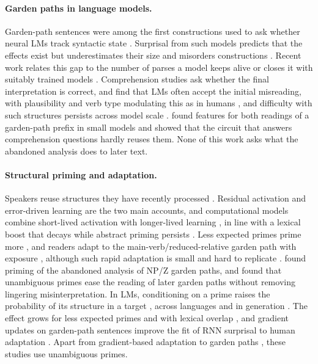 \documentclass[11pt]{article}
\begin{document}
\paragraph{Garden paths in language models.}
Garden-path sentences were among the first constructions used to ask whether neural LMs track syntactic state \citep{futrell2019}.
Surprisal from such models predicts that the effects exist but underestimates their size and misorders constructions \citep{vanschijndel2021,arehalli2022,huang2024}.
Recent work relates this gap to the number of parses a model keeps alive \citep{timkey2026} or closes it with suitably trained models \citep{yoshida2026}.
Comprehension studies ask whether the final interpretation is correct, and find that LMs often accept the initial misreading, with plausibility and verb type modulating this as in humans \citep{li2024incremental,amouyal2025}, and difficulty with such structures persists across model scale \citep{amouyal2026}.
\citet{hanna2025} found features for both readings of a garden-path prefix in small models and showed that the circuit that answers comprehension questions hardly reuses them.
None of this work asks what the abandoned analysis does to later text.

\paragraph{Structural priming and adaptation.}
Speakers reuse structures they have recently processed \citep{bock1986,pickering1998}.
Residual activation and error-driven learning \citep{chang2006} are the two main accounts, and computational models combine short-lived activation with longer-lived learning \citep{reitter2011}, in line with a lexical boost that decays while abstract priming persists \citep{hartsuiker2008}.
Less expected primes prime more \citep{jaeger2013}, and readers adapt to the main-verb/reduced-relative garden path with exposure \citep{fine2013}, although such rapid adaptation is small and hard to replicate \citep{harringtonstack2018,prasad2021}.
\citet{vangompel2006} found priming of the abandoned analysis of NP/Z garden paths, and \citet{fujita2020} found that unambiguous primes ease the reading of later garden paths without removing lingering misinterpretation.
In LMs, conditioning on a prime raises the probability of its structure in a target \citep{prasad2019,sinclair2022}, across languages \citep{michaelov2023} and in generation \citep{pucci2026}.
The effect grows for less expected primes and with lexical overlap \citep{jumelet2024,zhou2025icl}, and gradient updates on garden-path sentences improve the fit of RNN surprisal to human adaptation \citep{vanschijndel2018}.
Apart from gradient-based adaptation to garden paths \citep{vanschijndel2018}, these studies use unambiguous primes.
\end{document}
